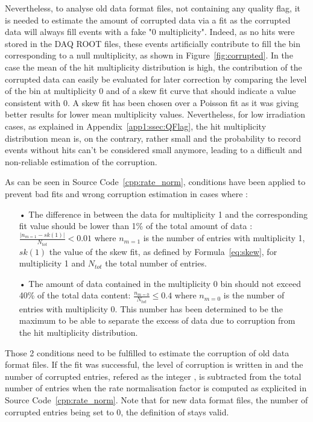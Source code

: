 	Nevertheless, to analyse old data format files, not containing any quality flag, it is needed to estimate the amount of corrupted data via a fit as the corrupted data will always fill events with a fake "0 multiplicity". Indeed, as no hits were stored in the DAQ ROOT files, these events artificially contribute to fill the bin corresponding to a null multiplicity, as shown in Figure~\ref{fig:corrupted}. In the case the mean of the hit multiplicity distribution is high, the contribution of the corrupted data can easily be evaluated for later correction by comparing the level of the bin at multiplicity 0 and of a skew fit curve that should indicate a value consistent with 0. A skew fit has been chosen over a Poisson fit as it was giving better results for lower mean multiplicity  values. Nevertheless, for low irradiation cases, as explained in Appendix~\ref{app1:ssec:QFlag}, the hit multiplicity distribution mean is, on the contrary, rather small and the probability to record events without hits can't be considered small anymore, leading to a difficult and non-reliable estimation of the corruption.
	
	As can be seen in Source Code~\ref{cpp:rate_norm}, conditions have been applied to prevent bad fits and wrong corruption estimation in cases where :

	\begin{itemize}
		\item[•] The difference in between the data for multiplicity 1 and the corresponding fit value should be lower than 1\% of the total amount of data : $\frac{\vert n_{m=1} - sk(1)\vert}{N_{tot}} < 0.01$ where $n_{m=1}$ is the number of entries with multiplicity 1, $sk(1)$ the value of the skew fit, as defined by Formula~\ref{eq:skew}, for multiplicity 1 and $N_{tot}$ the total number of entries.
		\item[•] The amount of data contained in the multiplicity 0 bin should not exceed 40\% of the total data content: $\frac{n_{m=0}}{N_{tot}} \leq 0.4$ where $n_{m=0}$ is the number of entries with multiplicity 0. This number has been determined to be the maximum to be able to separate the excess of data due to corruption from the hit multiplicity distribution.
	\end{itemize}
	
	Those 2 conditions need to be fulfilled to estimate the corruption of old data format files. If the fit was successful, the  level of corruption is written in  and the number of corrupted entries, refered as the integer , is subtracted from the total number of entries when the rate normalisation factor is computed as explicited in Source Code~\ref{cpp:rate_norm}. Note that for new data format files, the number of corrupted entries being set to 0, the definition of  stays valid.
	
